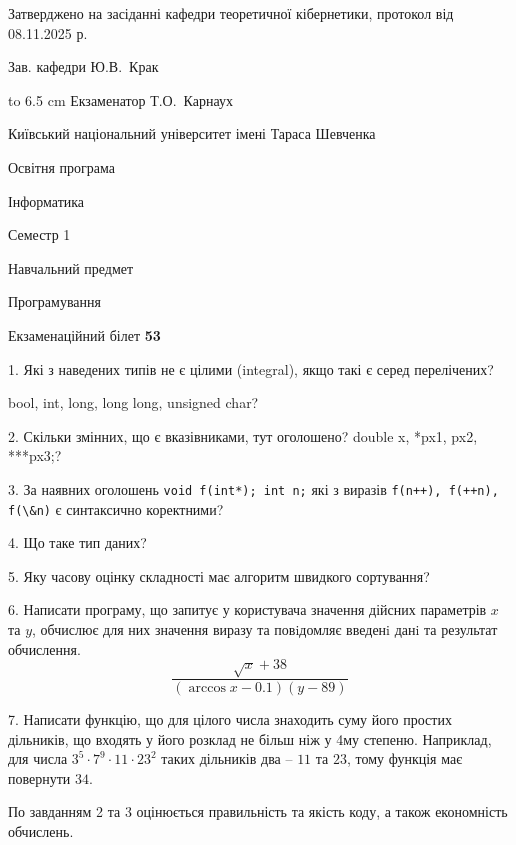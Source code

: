 \documentclass[12pt, ukrainian]{article}
\def\code#1{\Verb!#1!}
\begin{document}
{\smallskip\smallskip \begin {scriptsize} Затверджено на засіданні кафедри теоретичної кібернетики, протокол   від   08.11.2025 р.\par\smallskip\smallskip\smallskip\smallskip
{\parbox {6.5 cm} {Зав. кафедри \dotfill Ю.В.~Крак}}\hspace {0.7cm} {\hbox to 6.5 cm { Екзаменатор \dotfill Т.О.~Карнаух}} \end{scriptsize}}
\newpage
{{\begin {scriptsize}\par
{ \center  Київський національний університет імені Тараса Шевченка \par}
{\parbox {5 cm}{Освітня програма \hfill}{\parbox {7 cm}{Інформатика\hfill}}\parbox {6 cm}{\hfill Семестр 1}}\par
{\parbox {5 cm} {Навчальний предмет \hfill}\parbox {7 cm}{Програмування \hfill}\parbox {6cm}{\hfill}\par}\vspace{-15pt} \end{scriptsize}}{\center Екзаменаційний білет \No \textbf { 53 }\par}}
{%
1. Які з наведених типів не є цілими (integral), якщо такі є серед перелічених?

bool, int, long, long long, unsigned char?
\par
\vspace{2mm}
2. Скільки змінних, що є вказівниками, тут оголошено?
double x, *px1, px2, ***px3;?
\par
\vspace{2mm}
3. За наявних оголошень \code{void f(int*); int n;} які з виразів \code{f(n++), f(++n), f(\&n)} є синтаксично коректними?
\par
\vspace{2mm}
4. Що таке тип даних?
\par
\vspace{2mm}
5. Яку часову оцінку складності має алгоритм швидкого сортування?
\par
\vspace{2mm}
6. Написати програму, що запитує у користувача значення дійсних параметрів $x$ та $y$, обчислює для них значення виразу та повiдомляє введенi данi та результат обчислення.
$$\frac{\sqrt x + 38}{(\arccos x - 0.1) (y - 89)}$$ 

\par
7. Написати функцію, що для цілого числа знаходить суму його простих дільників, що входять у його розклад не більш ніж у 4му степеню. Наприклад, для числа $3^5{\cdot}7^9{\cdot}11{\cdot}23^{2}$ таких дільників два – $11$ та $23$, тому функція має повернути $34$.

По завданням 2 та 3 оцінюється правильність та якість коду, а також економність обчислень.

}
\end{document}
